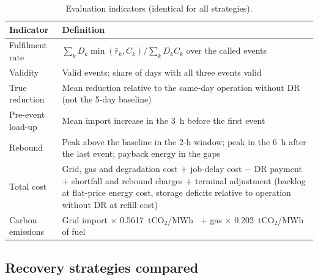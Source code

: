 \begin{table}[!t]
\caption{Evaluation indicators (identical for all strategies).}
\label{tab:metrics}
\centering\footnotesize
\begin{tabularx}{\columnwidth}{@{}>{\raggedright\arraybackslash}p{}X@{}}
\toprule
Indicator & Definition\\
\midrule
Fulfilment rate & $\sum_kD_k\min(\bar r_k,C_k)/\sum_kD_kC_k$ over the called events\\
Validity & Valid events; share of days with all three events valid\\
True reduction & Mean reduction relative to the same-day operation without DR (not the 5-day baseline)\\
Pre-event load-up & Mean import increase in the 3~h before the first event\\
Rebound & Peak above the baseline in the 2-h window; peak in the 6~h after the last event; payback energy in the gaps\\
Total cost & Grid, gas and degradation cost $+$ job-delay cost $-$ DR payment $+$ shortfall and rebound charges $+$ terminal adjustment (backlog at flat-price energy cost, storage deficits relative to operation without DR at refill cost)\\
Carbon emissions & Grid import $\times$ 0.5617~tCO$_2$/MWh~\cite{mee2024ef} $+$ gas $\times$ 0.202~tCO$_2$/MWh of fuel\\
\bottomrule
\end{tabularx}
\end{table}

\subsection{Recovery strategies compared}
\label{sec:strategies}

